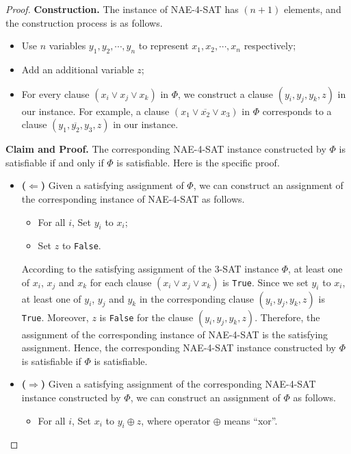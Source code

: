 \documentclass[12pt,a4paper]{article}
\theoremstyle{definition}
\begin{document}
\begin{enumerate}
\begin{proof}
    \textbf{Construction.} The instance of NAE-4-SAT has $(n+1)$ elements, and the construction process is as follows.
    \begin{itemize}
    \item Use $n$ variables $y_1, y_2, \cdots, y_n$ to represent $x_1, x_2, \cdots, x_n$ respectively;
    \item Add an additional variable $z$;
    \item For every clause $(x_i \lor x_j \lor x_k)$ in $\Phi$, we construct a clause $(y_i, y_j, y_k, z)$ in our instance. For example, a clause $(x_1 \lor \overline{x_2} \lor x_3)$ in $\Phi$ corresponds to a clause $(y_1, \overline{y_2}, y_3, z)$ in our instance.
    \end{itemize}
    
    \textbf{Claim and Proof.} The corresponding NAE-4-SAT instance constructed by $\Phi$ is satisfiable if and only if $\Phi$ is satisfiable. Here is the specific proof.
    \begin{itemize}
    \item \textbf{($\Longleftarrow$)} Given a satisfying assignment of $\Phi$, we can construct an assignment of the corresponding instance of NAE-4-SAT as follows.
        \begin{itemize}
        \item For all $i$, Set $y_i$ to $x_i$;
        \item Set $z$ to \texttt{False}.
        \end{itemize}
        According to the satisfying assignment of the 3-SAT instance $\Phi$, at least one of $x_i$, $x_j$ and $x_k$ for each clause $(x_i \lor x_j \lor x_k)$ is \texttt{True}. Since we set $y_i$ to $x_i$, at least one of $y_i$, $y_j$ and $y_k$ in the corresponding clause $(y_i, y_j, y_k, z)$ is \texttt{True}. Moreover, $z$ is \texttt{False} for the clause $(y_i, y_j, y_k, z)$. Therefore, the assignment of the corresponding instance of NAE-4-SAT is the satisfying assignment. Hence, the corresponding NAE-4-SAT instance constructed by $\Phi$ is satisfiable if $\Phi$ is satisfiable.
    \item \textbf{($\Longrightarrow$)} Given a satisfying assignment of the corresponding NAE-4-SAT instance constructed by $\Phi$, we can construct an assignment of $\Phi$ as follows.
        \begin{itemize}
        \item For all $i$, Set $x_i$ to $y_i \oplus z$, where operator $\oplus$ means ``xor''.
        \end{itemize}

\end{itemize}
\end{proof}
\end{enumerate}
\end{document}

